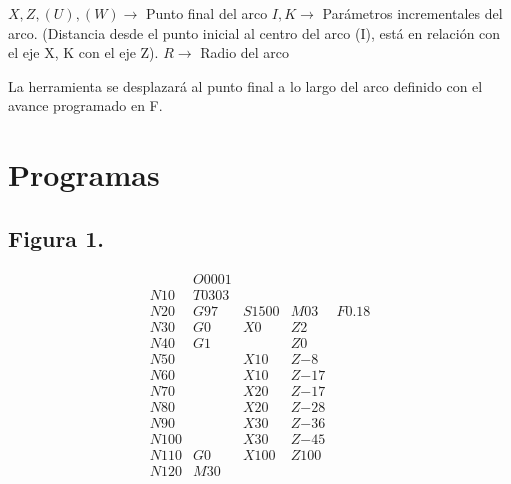 \documentclass{article}
\begin{document}
$X,Z,(U),(W) \longrightarrow$ Punto final del arco 
$I,K\longrightarrow$ Parámetros incrementales del arco. (Distancia desde el punto inicial al centro del arco (I), está en relación con el eje X, K con el eje Z).
$R \longrightarrow$ Radio del arco 

La herramienta se desplazará al punto final a lo largo del arco definido con el avance programado en F.



\section{Programas}

\subsection{Figura 1.}
\begin{equation*}
    \begin{matrix}
           & O0001 \\ 
        N10 & T0303 \\
        N20 & G97 & S1500 & M03 & F0.18 \\
        N30 & G0 & X0 & Z2 \\ 
        N40 & G1 & & Z0 \\
        N50 & & X10 &   Z{-8} \\ 
        N60 & & X10 &   Z{-17} \\
        N70 & & X20 &   Z{-17} \\
        N80 & & X20 &   Z{-28} \\
        N90 & & X30 &   Z{-36} \\
        N100 & & X30 &  Z{-45} \\
        N110 & G0 & X100 & Z100 \\
        N120 & M30 \\
    \end{matrix}
\end{equation*}
\end{document}
